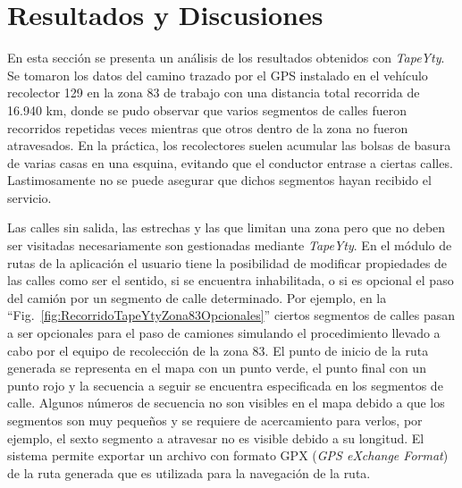 \documentclass[conference,compsoc]{IEEEtran}
\begin{document}
\section{Resultados y Discusiones}

En esta sección se presenta un análisis de los resultados obtenidos con \textit{TapeYty}. Se tomaron los datos del camino trazado por el GPS instalado en el vehículo recolector 129 en la zona 83 de trabajo con una distancia total recorrida de 16.940 km, donde se pudo observar que varios segmentos de calles fueron recorridos repetidas veces mientras que otros dentro de la zona no fueron atravesados. En la práctica, los recolectores suelen acumular las bolsas de basura de varias casas en una esquina, evitando que el conductor entrase a ciertas calles. Lastimosamente no se puede asegurar que dichos segmentos hayan recibido el servicio.

Las calles sin salida, las estrechas y las que limitan una zona pero que no deben ser visitadas necesariamente son gestionadas mediante \textit{TapeYty}. En el módulo de rutas de la aplicación el usuario tiene la posibilidad de modificar propiedades de las calles como ser el sentido, si se encuentra inhabilitada, o si es opcional el paso del camión por un segmento de calle determinado. Por ejemplo, en la ``Fig.~\ref{fig:RecorridoTapeYtyZona83Opcionales}'' ciertos segmentos de calles pasan a ser opcionales para el paso de camiones simulando el procedimiento llevado a cabo por el equipo de recolección de la zona 83. El punto de inicio de la ruta generada se representa en el mapa con un punto verde, el punto final con un punto rojo y la secuencia a seguir se encuentra especificada en los segmentos de calle. Algunos números de secuencia no son visibles en el mapa debido a que los segmentos son muy pequeños y se requiere de acercamiento para verlos, por ejemplo, el sexto segmento a atravesar no es visible debido a su longitud. El sistema permite exportar un archivo con formato GPX (\textit{GPS eXchange Format}) de la ruta generada que es utilizada para la navegación de la ruta.
\end{document}
